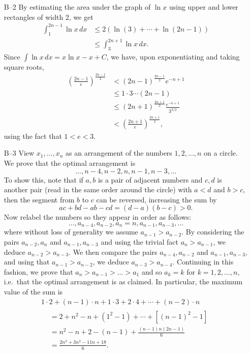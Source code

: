 \documentclass[amssymb,twocolumn,pra,10pt,aps]{revtex4-1}
\begin{document}
\begin{itemize}
\item[B--2]
By estimating the area under the graph of $\ln x$ using upper and
lower rectangles of width 2, we get
\begin{align*}
\int_1^{2n-1} \ln x\,dx &\leq 2(\ln(3) + \cdots + \ln(2n-1)) \\
&\leq \int_3^{2n+1} \ln x\,dx.
\end{align*}
Since $\int \ln x\,dx = x \ln x - x + C$, we have, upon exponentiating
and taking square roots,
\begin{align*}
\left( \frac{2n-1}{e} \right)^{\frac{2n-1}{2}}
&< (2n-1)^{\frac{2n-1}{2}} e^{-n+1} \\
& \leq 1 \cdot 3 \cdots (2n-1) \\
& \leq (2n+1)^{\frac{2n+1}{2}} \frac{e^{-n+1}}{3^{3/2}} \\
& < \left( \frac{2n+1}{e} \right)^{\frac{2n+1}{2}},
\end{align*}
using the fact that $1 < e < 3$.

\item[B--3]
View $x_1, \dots, x_n$ as an arrangement of the numbers $1, 2, \dots,
n$ on a circle.
We prove that the optimal arrangement is
\[
\dots, n-4, n-2, n, n-1, n-3, \dots
\]
To show this, note that if
$a, b$ is a pair of adjacent numbers and $c,d$ is another pair (read
in the same order around the circle) with $a < d$ and $b > c$, then
the segment from $b$ to $c$ can be reversed, increasing the sum by
\[
ac + bd - ab - cd = (d-a)(b-c) > 0.
\]
Now relabel the numbers so they appear in order as follows:
\[
\dots, a_{n-4}, a_{n-2}, a_n = n, a_{n-1}, a_{n-3}, \dots
\]
where without loss of generality we assume $a_{n-1} > a_{n-2}$. By
considering the pairs $a_{n-2}, a_n$ and $a_{n-1}, a_{n-3}$ and using
the trivial fact $a_n > a_{n-1}$, we deduce $a_{n-2} > a_{n-3}$. We
then compare the pairs $a_{n-4}, a_{n-2}$ and $a_{n-1}, a_{n-3}$, and
using that $a_{n-1} > a_{n-2}$, we deduce $a_{n-3} > a_{n-4}$.
Continuing in this
fashion, we prove that $a_n > a_{n-1} > \dots > a_1$ and
so $a_k = k$ for $k = 1, 2, \dots, n$, i.e.\ that the optimal
arrangement is as claimed. In particular, the maximum value of the sum
is
\begin{multline*}
1 \cdot 2 + (n-1)\cdot n + 1 \cdot 3 + 2 \cdot 4 + \cdots + (n-2)\cdot n \\
\begin{aligned}
&= 2 + n^2 - n + (1^2 - 1) + \cdots + [(n-1)^2 - 1] \\
&= n^2 - n + 2 - (n-1) + \frac{(n-1)n(2n-1)}{6} \\
&= \frac{2n^3 + 3n^2 - 11n + 18}{6}.
\end{aligned}
\end{multline*}


\end{itemize}
\end{document}
